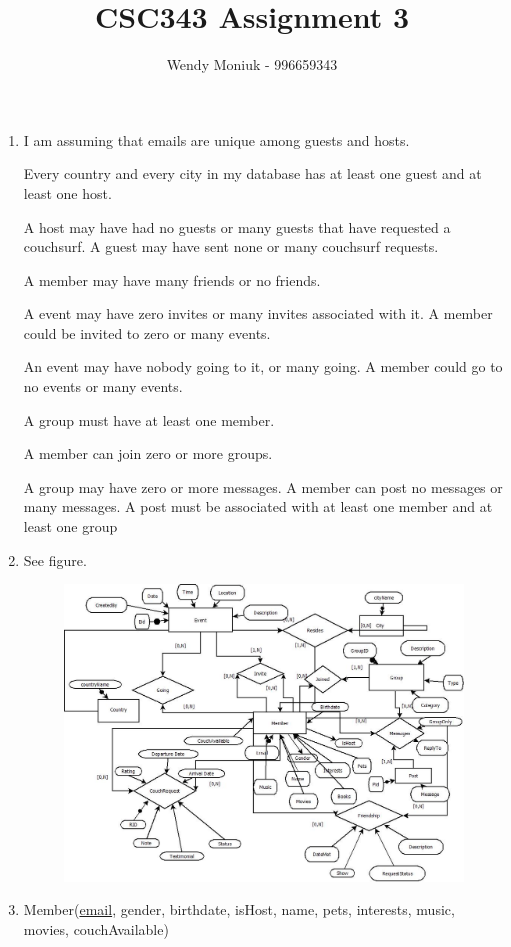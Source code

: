 \documentclass[10pt,a4paper]{article}
\author{Wendy Moniuk - 996659343}
\title{CSC343 Assignment 3}
\begin{document}
\begin{enumerate}

\item I am assuming that emails are unique among guests and hosts.

Every country and every city in my database has at least one guest and at least one host.

A host may have had no guests or many guests that have requested a couchsurf. A guest may have sent none or many couchsurf requests.

A member may have many friends or no friends.

A event may have zero invites or many invites associated with it. A member could be invited to zero or many events.

An event may have nobody going to it, or many going. A member could go to no events or many events.

A group must have at least one member.

A member can join zero or more groups.

A group may have zero or more messages. A member can post no messages or many messages. A post must be associated with at least one member and at least one group



\item See figure.
\begin{figure}
\includegraphics[width=5.5in]{./Diagram1}
\end{figure}

\item Member(\underline{email}, gender, birthdate, isHost, name, pets, interests, music, movies, couchAvailable)


\end{enumerate}
\end{document}

